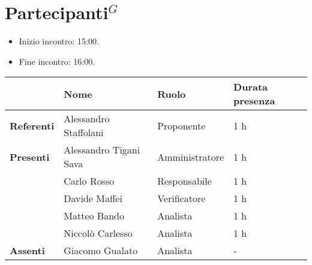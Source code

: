\section*{\gls{Partecipanti}$^G$}

\begin{itemize}
	\item Inizio incontro: 15:00.
	\item Fine incontro: 16:00.
\end{itemize}


\begin{center}
	{\renewcommand{\arraystretch}{1.5}
		\begin{tabular}{l|lll}
			                   & \textbf{Nome}          & \textbf{Ruolo} & \textbf{Durata presenza} \\
			\hline
			\textbf{Referenti} & Alessandro Staffolani  & Proponente     & 1 h                      \\
			\hline
			\textbf{Presenti}  & Alessandro Tigani Sava & Amministratore & 1 h                      \\
			                   & Carlo Rosso            & Responsabile   & 1 h                      \\
			                   & Davide Maffei          & Verificatore   & 1 h                      \\
			                   & Matteo Bando           & Analista       & 1 h                      \\
			                   & Niccolò Carlesso       & Analista       & 1 h                      \\
			\hline
			\textbf{Assenti}   & Giacomo Gualato        & Analista       & -                        \\
		\end{tabular}
	}
\end{center}
